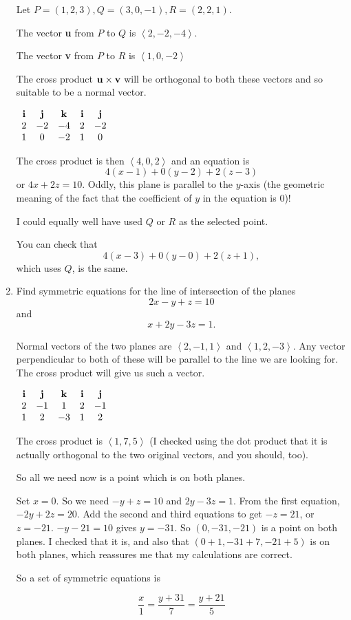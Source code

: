 \documentclass[12pt]{article}
\begin{document}
\begin{enumerate}
Let $P=(1,2,3), Q=(3,0,-1), R=(2,2,1)$.

The vector {\bf u} from $P$ to $Q$ is $\left<2,-2,-4\right>$.

The vector {\bf v} from  $P$ to $R$ is $\left<1,0,-2\right>$

The cross product ${\bf u} \times {\bf v}$ will be orthogonal to both these vectors and so suitable
to be a normal vector.

$\begin{array}{ccccc}

{\bf i} & {\bf j} & {\bf k} & {\bf i} & {\bf j} \\

2 & -2 & -4 & 2 & -2 \\

1 & 0 & -2 & 1 & 0 \\ \end{array}$

The cross product is then $\left<4,0,2\right>$  and an equation is $$4(x-1) + 0(y-2) + 2(z-3)$$ or $4x + 2z = 10$.  Oddly, this plane
is parallel to the $y$-axis (the geometric meaning of the fact that the coefficient of $y$ in the equation is 0)!

I could equally well have used $Q$ or $R$ as the selected point.

You can check that $$4(x-3) + 0(y-0) + 2(z+1),$$  which uses $Q$, is the same.

\newpage

\item  Find symmetric equations for the line of intersection of the planes $$2x-y+z = 10$$ and $$x+2y-3z = 1.$$

Normal vectors of the two planes are $\left<2,-1,1\right>$ and $\left<1,2,-3\right>$.  Any vector perpendicular to both of these will be parallel to the line we are looking for.  The cross product will give us such a vector.

$\begin{array}{ccccc}

{\bf i} & {\bf j} & {\bf k} & {\bf i} & {\bf j} \\

2 & -1 & 1 & 2 & -1 \\

1 & 2 & -3 & 1 & 2 \\ \end{array}$

The cross product is $\left<1,7,5\right>$  (I checked using the dot product that it is actually orthogonal to the two original vectors, and you should, too).

So all we need now is a point which is on both planes.

Set $x=0$.  So we need $-y+z=10$ and $2y-3z=1$.  From the first equation, $-2y+2z=20$.  Add the second and third equations to get $-z=21$, or $z=-21$. $-y-21=10$ gives $y=-31$.
So $(0,-31,-21)$ is a point on both planes.  I checked that it is, and also that $(0+1,-31+7,-21+5)$ is on both planes, which reassures me that my calculations are correct.

So a set of symmetric equations is

$$\frac x1 = \frac{y+31}7 = \frac{y+21}5$$

\end{enumerate}
\end{document}
